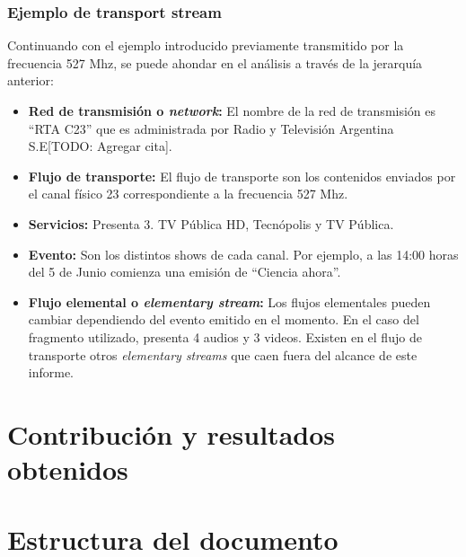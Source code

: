 \subsubsection{Ejemplo de transport stream}

Continuando con el ejemplo introducido previamente transmitido por la frecuencia 527 Mhz, se puede ahondar en el análisis a través de la jerarquía anterior:

\begin{itemize}
\item \textbf{Red de transmisión o \emph{network}:} El nombre de la red de transmisión es ``RTA C23'' que es administrada por Radio y Televisión Argentina S.E[TODO: Agregar cita]. 
\item \textbf{Flujo de transporte:} El flujo de transporte son los contenidos enviados por el canal físico 23 correspondiente a la frecuencia 527 Mhz.
\item \textbf{Servicios:} Presenta 3. TV Pública HD, Tecnópolis y TV Pública.
\item \textbf{Evento:} Son los distintos shows de cada canal. Por ejemplo, a las 14:00 horas del 5 de Junio comienza una emisión de ``Ciencia ahora''.
\item \textbf{Flujo elemental o \emph{elementary stream}:} Los flujos elementales pueden cambiar dependiendo del evento emitido en el momento. En el caso del fragmento utilizado, presenta 4 audios y 3 videos. Existen en el flujo de transporte otros \emph{elementary streams} que caen fuera del alcance de este informe.
\end{itemize}

\section{Contribuci\'on y resultados obtenidos}

\section{Estructura del documento}

\ifx\all\undefined

\fi


